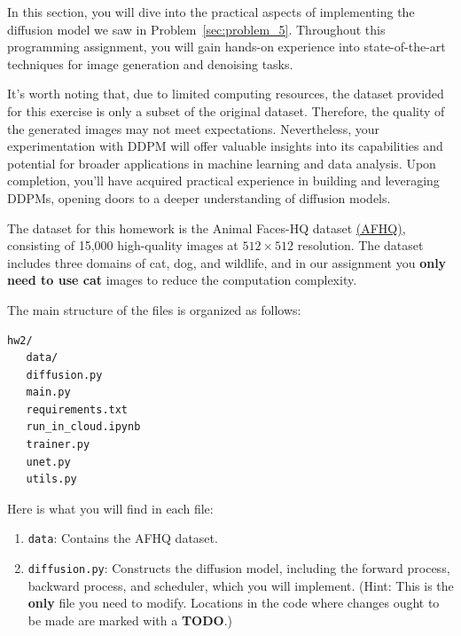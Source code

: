 \documentclass[11pt,addpoints,answers]{exam}
\begin{document}
\begin{questions}
In this section, you will dive into the practical aspects of implementing the diffusion model we saw in Problem~\ref{sec:problem_5}. Throughout this programming assignment, you will gain hands-on experience into state-of-the-art techniques for image generation and denoising tasks.

It's worth noting that, due to limited computing resources, the dataset provided for this exercise is only a subset of the original dataset. Therefore, the quality of the generated images may not meet expectations. Nevertheless, your experimentation with DDPM will offer valuable insights into its capabilities and potential for broader applications in machine learning and data analysis. Upon completion, you'll have acquired practical experience in building and leveraging DDPMs, opening doors to a deeper understanding of diffusion models.

 The dataset for this homework is the Animal Faces-HQ dataset \href{https://github.com/clovaai/stargan-v2/blob/master/README.md#animal-faces-hq-dataset-afhq}{(AFHQ)}, consisting of 15,000 high-quality images at $512\times512$ resolution. The dataset includes three domains of cat, dog, and wildlife, and in our assignment you \textbf{only need to use cat} images to reduce the computation complexity.




The main structure of the files is organized as follows:
\begin{verbatim}
hw2/
   data/
   diffusion.py
   main.py
   requirements.txt
   run_in_cloud.ipynb
   trainer.py
   unet.py
   utils.py
\end{verbatim}

Here is what you will find in each file:
\begin{enumerate}
    
    \item \lstinline{data}: Contains the AFHQ dataset.
    
    \item \lstinline{diffusion.py}: Constructs the diffusion model, including the forward process, backward process, and scheduler, which you will implement. (Hint: This is the \textbf{only} file you need to modify. Locations in the code where changes ought to be made are marked with a \textbf{TODO}.)


\end{enumerate}
\end{questions}
\end{document}
